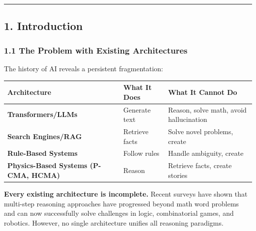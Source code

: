 \documentclass[
  11pt,
  a4paper,
]{article}
\begin{document}
\begin{center}\rule{0.5\linewidth}{0.5pt}\end{center}

\subsection{1. Introduction}\label{introduction}

\subsubsection{1.1 The Problem with Existing
Architectures}\label{the-problem-with-existing-architectures}

The history of AI reveals a persistent fragmentation:

\begin{longtable}[]{@{}
  >{\raggedright\arraybackslash}p{}
  >{\raggedright\arraybackslash}p{}
  >{\raggedright\arraybackslash}p{}@{}}
\toprule\noalign{}
\begin{minipage}[b]{\linewidth}\raggedright
Architecture
\end{minipage} & \begin{minipage}[b]{\linewidth}\raggedright
What It Does
\end{minipage} & \begin{minipage}[b]{\linewidth}\raggedright
What It Cannot Do
\end{minipage} \\
\midrule\noalign{}
\endhead
\bottomrule\noalign{}
\endlastfoot
\textbf{Transformers/LLMs} & Generate text & Reason, solve math, avoid
hallucination \\
\textbf{Search Engines/RAG} & Retrieve facts & Solve novel problems,
create \\
\textbf{Rule-Based Systems} & Follow rules & Handle ambiguity, create \\
\textbf{Physics-Based Systems (P-CMA, HCMA)} & Reason & Retrieve facts,
create stories \\
\end{longtable}

\textbf{Every existing architecture is incomplete.} Recent surveys have
shown that multi-step reasoning approaches have progressed beyond math
word problems and can now successfully solve challenges in logic,
combinatorial games, and robotics. However, no single architecture
unifies all reasoning paradigms.
\end{document}

